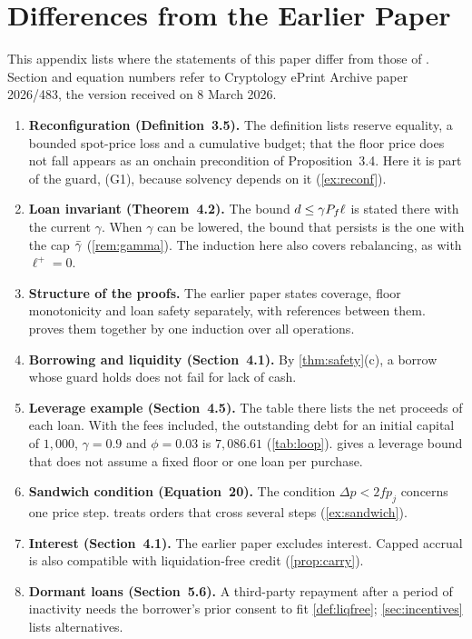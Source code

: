 \section{Differences from the Earlier Paper}\label{app:errata}

This appendix lists where the statements of this paper differ from those of \vone. Section and equation numbers refer to Cryptology ePrint Archive paper 2026/483, the version received on 8 March 2026.

\begin{enumerate}[leftmargin=2em,itemsep=4pt]
\item \textbf{Reconfiguration (Definition~3.5).} The definition lists reserve equality, a bounded spot-price loss and a cumulative budget; that the floor price does not fall appears as an onchain precondition of Proposition~3.4. Here it is part of the guard, (G1), because solvency depends on it (\cref{ex:reconf}).
\item \textbf{Loan invariant (Theorem~4.2).} The bound $d\le\gamma P_f\ell$ is stated there with the current $\gamma$. When $\gamma$ can be lowered, the bound that persists is the one with the cap $\bar\gamma$ (\cref{rem:gamma}). The induction here also covers rebalancing, as  with $\ell^+=0$.
\item \textbf{Structure of the proofs.} The earlier paper states coverage, floor monotonicity and loan safety separately, with references between them.  proves them together by one induction over all operations.
\item \textbf{Borrowing and liquidity (Section~4.1).} By \cref{thm:safety}(c), a borrow whose guard holds does not fail for lack of cash.
\item \textbf{Leverage example (Section~4.5).} The table there lists the net proceeds of each loan. With the fees included, the outstanding debt for an initial capital of $1{,}000$, $\gamma=0.9$ and $\phi=0.03$ is $7{,}086.61$ (\cref{tab:loop}).  gives a leverage bound that does not assume a fixed floor or one loan per purchase.
\item \textbf{Sandwich condition (Equation~20).} The condition $\Delta p<2fp_j$ concerns one price step.  treats orders that cross several steps (\cref{ex:sandwich}).
\item \textbf{Interest (Section~4.1).} The earlier paper excludes interest. Capped accrual is also compatible with liquidation-free credit (\cref{prop:carry}).
\item \textbf{Dormant loans (Section~5.6).} A third-party repayment after a period of inactivity needs the borrower's prior consent to fit \cref{def:liqfree}; \cref{sec:incentives} lists alternatives.

\end{enumerate}

